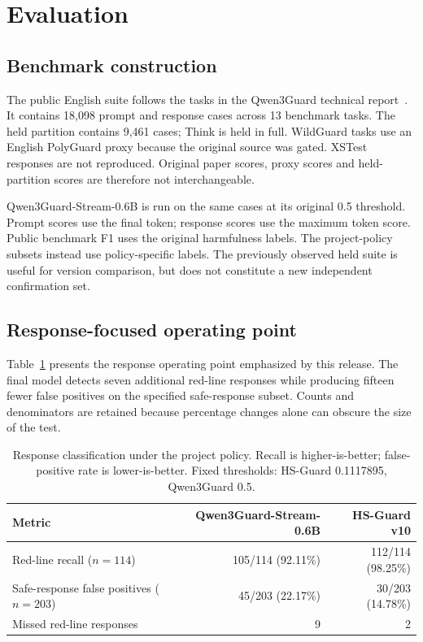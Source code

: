 \documentclass[11pt]{article}
\begin{document}
\section{Evaluation}
\subsection{Benchmark construction}
The public English suite follows the tasks in the Qwen3Guard technical report~\cite{qwen3guard}. It contains 18,098 prompt and response cases across 13 benchmark tasks. The held partition contains 9,461 cases; Think is held in full. WildGuard tasks use an English PolyGuard proxy because the original source was gated. XSTest responses are not reproduced. Original paper scores, proxy scores and held-partition scores are therefore not interchangeable.

Qwen3Guard-Stream-0.6B is run on the same cases at its original 0.5 threshold. Prompt scores use the final token; response scores use the maximum token score. Public benchmark F1 uses the original harmfulness labels. The project-policy subsets instead use policy-specific labels. The previously observed held suite is useful for version comparison, but does not constitute a new independent confirmation set.

\subsection{Response-focused operating point}
Table~\ref{tab:response} presents the response operating point emphasized by this release. The final model detects seven additional red-line responses while producing fifteen fewer false positives on the specified safe-response subset. Counts and denominators are retained because percentage changes alone can obscure the size of the test.
\begin{table}[h]
\centering
\caption{Response classification under the project policy. Recall is higher-is-better; false-positive rate is lower-is-better. Fixed thresholds: HS-Guard 0.1117895, Qwen3Guard 0.5.}
\label{tab:response}
\begin{tabular}{lrr}\toprule
Metric & Qwen3Guard-Stream-0.6B & HS-Guard v10\\\midrule
Red-line recall ($n=114$) & 105/114 (92.11\%) & 112/114 (98.25\%)\\
Safe-response false positives ($n=203$) & 45/203 (22.17\%) & 30/203 (14.78\%)\\
Missed red-line responses & 9 & 2\\\bottomrule
\end{tabular}
\end{table}
\end{document}

